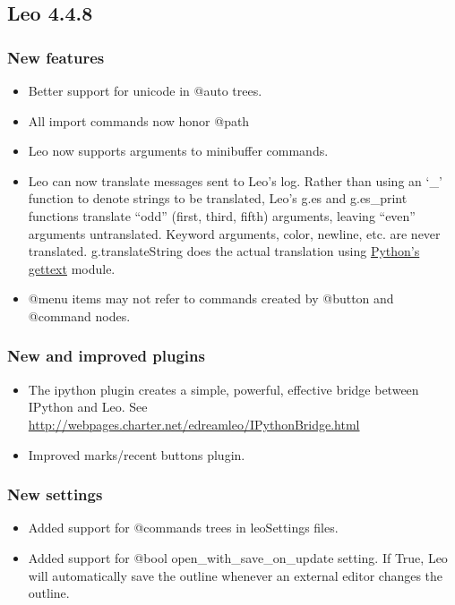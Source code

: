 \documentclass[a4paper,10pt,english]{sphinxmanual}
\begin{document}
\subsection{Leo 4.4.8}
\label{what-is-new:leo-4-4-8}

\subsubsection{New features}
\label{what-is-new:new-features}\begin{itemize}
\item {} 
Better support for unicode in @auto trees.

\item {} 
All import commands now honor @path

\item {} 
Leo now supports arguments to minibuffer commands.

\item {} 
Leo can now translate messages sent to Leo's log. Rather than using an `\_'
function to denote strings to be translated, Leo's g.es and g.es\_print
functions translate ``odd'' (first, third, fifth) arguments, leaving ``even''
arguments untranslated. Keyword arguments, color, newline, etc. are never
translated. g.translateString does the actual translation using
\href{http://docs.python.org/lib/module-gettext.html}{Python's gettext} module.

\item {} 
@menu items may not refer to commands created by @button and @command nodes.

\end{itemize}


\subsubsection{New and improved plugins}
\label{what-is-new:new-and-improved-plugins}\begin{itemize}
\item {} 
The ipython plugin creates a simple, powerful, effective bridge between IPython and Leo.
See \href{http://webpages.charter.net/edreamleo/IPythonBridge.html}{http://webpages.charter.net/edreamleo/IPythonBridge.html}

\item {} 
Improved marks/recent buttons plugin.

\end{itemize}


\subsubsection{New settings}
\label{what-is-new:id10}\begin{itemize}
\item {} 
Added support for @commands trees in leoSettings files.

\item {} 
Added support for @bool open\_with\_save\_on\_update setting. If True, Leo will
automatically save the outline whenever an external editor changes the
outline.

\end{itemize}
\end{document}
